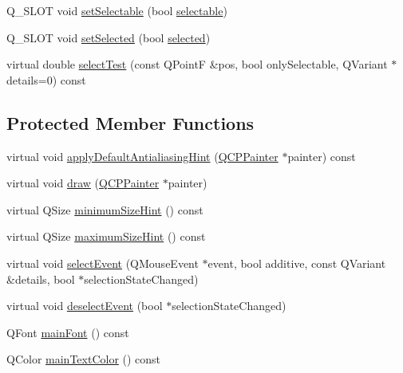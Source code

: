 \begin{DoxyCompactItemize}
\item 
Q\+\_\+\+S\+L\+OT void \hyperlink{classQCPPlotTitle_a8866b07b9fa14877d4cefbf38406c5dd}{set\+Selectable} (bool \hyperlink{classQCPPlotTitle_a8d75c7cbcf2049c9512a3335d6f11416}{selectable})
\item 
Q\+\_\+\+S\+L\+OT void \hyperlink{classQCPPlotTitle_a8d441a889d371307df86f1ab7687a333}{set\+Selected} (bool \hyperlink{classQCPPlotTitle_a9771f3a4bca026484d7c8b5d953b5e82}{selected})
\item 
virtual double \hyperlink{classQCPPlotTitle_a5b7ae716be9134a48f4e378feb0e6699}{select\+Test} (const Q\+PointF \&pos, bool only\+Selectable, Q\+Variant $\ast$details=0) const 
\end{DoxyCompactItemize}
\subsection*{Protected Member Functions}
\begin{DoxyCompactItemize}
\item 
virtual void \hyperlink{classQCPPlotTitle_a0e2a491864bf8d8e8b159ef38e9d85bd}{apply\+Default\+Antialiasing\+Hint} (\hyperlink{classQCPPainter}{Q\+C\+P\+Painter} $\ast$painter) const 
\item 
virtual void \hyperlink{classQCPPlotTitle_ae4f1f8d24489628dabb7256363b097d2}{draw} (\hyperlink{classQCPPainter}{Q\+C\+P\+Painter} $\ast$painter)
\item 
virtual Q\+Size \hyperlink{classQCPPlotTitle_a695e6037e72a1e129387e7e4a980faea}{minimum\+Size\+Hint} () const 
\item 
virtual Q\+Size \hyperlink{classQCPPlotTitle_a2afaf11a379038e5ca58040a0eb0ae4c}{maximum\+Size\+Hint} () const 
\item 
virtual void \hyperlink{classQCPPlotTitle_a22672ef2abe442b1e73b7ee04cff9bdd}{select\+Event} (Q\+Mouse\+Event $\ast$event, bool additive, const Q\+Variant \&details, bool $\ast$selection\+State\+Changed)
\item 
virtual void \hyperlink{classQCPPlotTitle_ac6dfce05bebdb9bd0bfacd5ff02f3325}{deselect\+Event} (bool $\ast$selection\+State\+Changed)
\item 
Q\+Font \hyperlink{classQCPPlotTitle_a7e74004e3a68118b16491848708a8b3a}{main\+Font} () const 
\item 
Q\+Color \hyperlink{classQCPPlotTitle_ac1b02546563a2e76f97d78a576f82f5a}{main\+Text\+Color} () const 
\end{DoxyCompactItemize}
